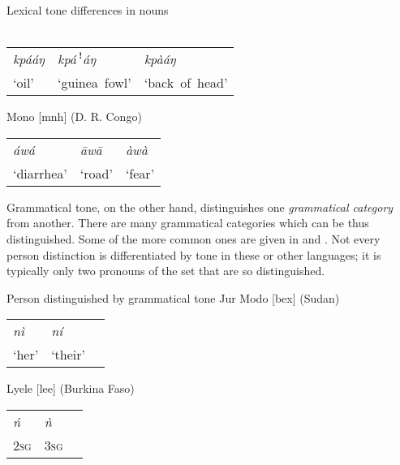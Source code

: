 \documentclass[output=paper]{langscibook}
\begin{document}
\ea Lexical tone differences in nouns\\
\label{ex:LexicalToneDifferencesNouns:1}
\ea
{}\smallskip\\
\begin{tabularx}{\linewidth}{@{}XXX@{}}
\textit{kpááŋ} & \textit{kpá}\,ꜝ\textit{áŋ} &  \textit{kpàáŋ}\\
‘oil’          & ‘guinea~fowl’                              & ‘back~of~head’ \\
\end{tabularx}
\ex
Mono [mnh] (D. R. Congo) \citep[198]{Olson2005}\smallskip\\
\begin{tabularx}{\linewidth}{@{}XXX@{}}
\textit{áwá} & {\textit{\=aw\=a}} &  {\textit{àwà}}\\
‘diarrhea’   &  ‘road’            &  ‘fear’ \\
\end{tabularx}
\z\z
Grammatical tone, on the other hand, distinguishes one \textit{grammatical category} from another. There are many grammatical categories which can be thus distinguished. Some of the more common ones are given in  and . Not every person distinction is differentiated by tone in these or other languages; it is typically only two pronouns of the set that are so distinguished.

\ea Person distinguished by grammatical tone\label{tab:PersonByGrammaticalTone:2}
\ea Jur Modo  [bex]  (Sudan) \citep[80]{Persson2004}\smallskip\\
    \begin{tabularx}{\linewidth}{@{}XXX@{}}
    \textit{nì}   & \textit{ní} & \\
    ‘her’         & ‘their’     & \\
    \end{tabularx}
\ex Lyele [lee] (Burkina Faso) \citep[57]{Kutsch2014}\smallskip\\ 
    \begin{tabularx}{\linewidth}{@{}XXX@{}}
    \textit{ń}    & \textit{ǹ}   & \\
    \textsc{2sg}  & \textsc{3sg} & \\
    \end{tabularx}
\z
\z
\end{document}
